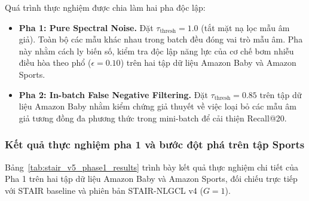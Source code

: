 Quá trình thực nghiệm được chia làm hai pha độc lập:
\begin{itemize}
    \item \textbf{Pha 1: Pure Spectral Noise.} Đặt $\tau_{\text{thresh}} = 1.0$ (tắt mặt nạ lọc mẫu âm giả). Toàn bộ các mẫu khác nhau trong batch đều đóng vai trò mẫu âm. Pha này nhằm cách ly biến số, kiểm tra độc lập năng lực của cơ chế bơm nhiễu điều hòa theo phổ ($\epsilon = 0.10$) trên hai tập dữ liệu Amazon Baby và Amazon Sports.
    \item \textbf{Pha 2: In-batch False Negative Filtering.} Đặt $\tau_{\text{thresh}} = 0.85$ trên tập dữ liệu Amazon Baby nhằm kiểm chứng giả thuyết về việc loại bỏ các mẫu âm giả tương đồng đa phương thức trong mini-batch để cải thiện Recall@20.
\end{itemize}

\subsubsection{Kết quả thực nghiệm pha 1 và bước đột phá trên tập Sports}

Bảng~\ref{tab:stair_v5_phase1_results} trình bày kết quả thực nghiệm chi tiết của Pha 1 trên hai tập dữ liệu Amazon Baby và Amazon Sports, đối chiếu trực tiếp với STAIR baseline và phiên bản STAIR-NLGCL v4 ($G=1$).

